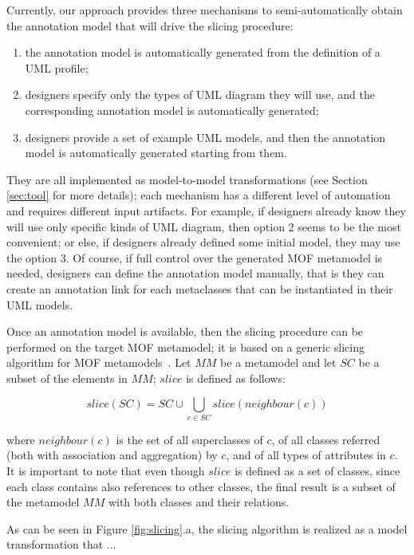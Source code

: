 Currently, our approach provides three mechanisms to semi-automatically obtain the annotation model that will drive the slicing procedure:

\begin{enumerate}
	\item the annotation model is automatically generated from the definition of a UML profile;
	\item designers specify only the types of UML diagram they will use, and the corresponding annotation model is automatically generated;
	\item designers provide a set of example UML models, and then the annotation model is automatically generated starting from them.
\end{enumerate}

They are all implemented as model-to-model transformations (see Section \ref{sec:tool} for more details);
each mechanism has a different level of automation and requires different input artifacts.
For example, if designers already know they will use only specific kinds of UML diagram, then option 2 seems to be the most convenient;
or else, if designers already defined some initial model, they may use the option 3.
Of course, if full control over the generated MOF metamodel is needed, designers can define the annotation model manually, that is they can create an annotation link for each metaclasses that can be instantiated in their UML models.

Once an annotation model is available, then the slicing procedure can be performed on the target MOF metamodel;
it is based on a generic slicing algorithm for MOF metamodels~\cite{ICSEbyadl}. Let
$MM$ be a metamodel and let $SC$ be a subset of the elements in
$MM$; $slice$ is defined as follows:

\vspace{-.2cm}
$$slice(SC)=SC \cup \displaystyle\bigcup_{c \in
SC}{slice(neighbour(c))}$$
\vspace{-.2cm}

\noindent where $neighbour(c)$ is the set of all superclasses of
$c$, of all classes referred (both with association and
aggregation) by $c$, and of all types of attributes in $c$. 
It is important to note that even though $slice$ is defined
as a set of classes, since each class contains also references
to other classes, the final result is a subset of the metamodel $MM$
with both classes and their relations.


As can be seen in Figure \ref{fig:slicing}.a, the slicing algorithm is realized as a model transformation that ...


